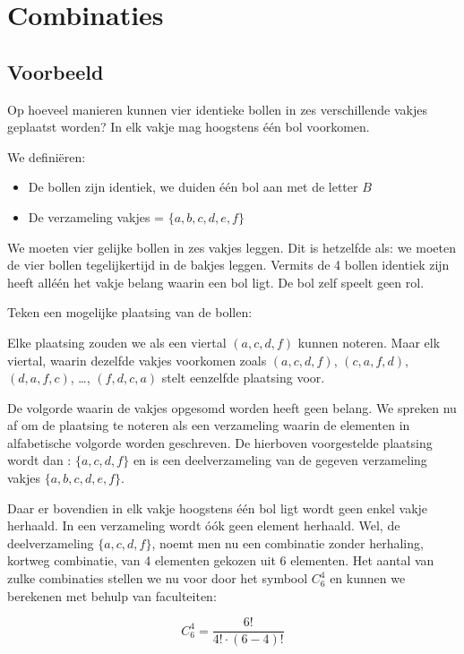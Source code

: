 \documentclass[12pt,twoside]{article}
\begin{document}
\pagebreak
\section{Combinaties}

\begin{theorie}
\subsection{Voorbeeld}

Op hoeveel manieren kunnen vier identieke bollen in zes verschillende vakjes geplaatst worden? In elk vakje mag hoogstens één bol voorkomen.

We definiëren:
\begin{itemize}
  \item De bollen zijn identiek, we duiden één bol aan met de letter $B$
  \item De verzameling vakjes = $\{a, b, c, d, e, f\}$
\end{itemize}

We moeten vier gelijke bollen in zes vakjes leggen. Dit is hetzelfde als: we moeten de vier bollen tegelijkertijd in de bakjes leggen. Vermits de 4 bollen identiek zijn heeft alléén het vakje belang waarin een bol ligt. De bol zelf speelt geen rol.

Teken een mogelijke plaatsing van de bollen:

Elke plaatsing zouden we als een viertal $(a, c, d, f)$ kunnen noteren. Maar elk viertal, waarin dezelfde vakjes voorkomen zoals $(a, c, d, f)$, $(c, a, f, d)$, $(d, a, f, c)$, \ldots, $(f, d, c, a)$ stelt eenzelfde plaatsing voor.

De volgorde waarin de vakjes opgesomd worden heeft geen belang. We spreken nu
af om de plaatsing te noteren als een verzameling waarin de elementen in
alfabetische volgorde worden geschreven. De hierboven voorgestelde plaatsing
wordt dan : $\{a, c, d, f\}$ en is een deelverzameling van de gegeven verzameling vakjes $\{a, b, c, d, e, f\}$.

Daar er bovendien in elk vakje hoogstens één bol ligt wordt geen enkel vakje
herhaald. In een verzameling wordt óók geen element herhaald. Wel, de
deelverzameling $\{a, c, d, f\}$, noemt men nu een combinatie zonder herhaling, kortweg combinatie, van 4 elementen gekozen uit 6 elementen.
Het aantal van zulke combinaties stellen we nu voor door het symbool $C^4_6$ en kunnen we berekenen met behulp van faculteiten:

$$C^4_6=\dfrac{6!}{4!\cdot (6-4)!}$$


\end{theorie}
\end{document}
